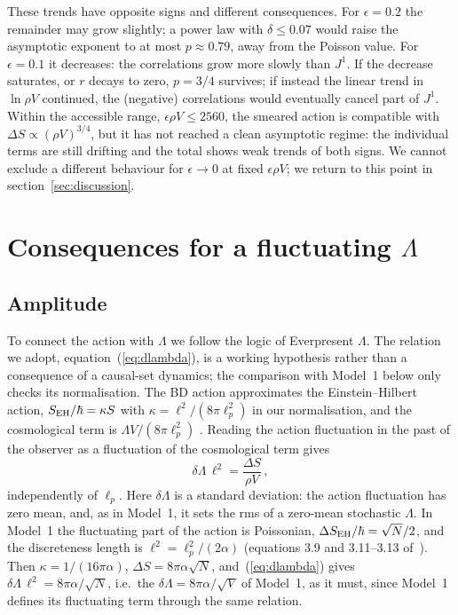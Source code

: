 \documentclass{iopjournal}
\newcommand{\eref}[1]{(\ref{#1})}
\newcommand{\rhoV}{\rho V}
\newcommand{\Jone}{J^{1}}
\begin{document}
These trends have opposite signs and different consequences. For
$\epsilon=0.2$ the remainder may grow slightly; a power law with
$\delta\le0.07$ would raise the asymptotic exponent to at most $p\approx0.79$,
away from the Poisson value. For $\epsilon=0.1$ it decreases: the
correlations grow more slowly than $\Jone$. If the decrease saturates, or $r$
decays to zero, $p=3/4$ survives; if instead the linear trend in $\ln\rhoV$
continued, the (negative) correlations would eventually cancel part of
$\Jone$. Within the accessible range, $\epsilon\rhoV\le2560$, the smeared
action is compatible with $\Delta S\propto(\rhoV)^{3/4}$, but it
has not reached a clean asymptotic regime: the individual terms are still
drifting and the total shows weak trends of both signs. We cannot exclude a
different behaviour for $\epsilon\to0$ at fixed $\epsilon\rhoV$; we return to
this point in section~\ref{sec:discussion}.

\section{Consequences for a fluctuating $\Lambda$}
\label{sec:lambda}

\subsection{Amplitude}

To connect the action with $\Lambda$ we follow the logic of Everpresent
$\Lambda$. The relation we adopt, equation~\eref{eq:dlambda}, is a working
hypothesis rather than a consequence of a causal-set dynamics; the comparison
with Model~1 below only checks its normalisation. The BD action approximates the Einstein--Hilbert action,
$S_{\rm EH}/\hbar=\kappa S$ with $\kappa=\ell^2/(8\pi\ell_p^2)$ in our
normalisation, and the cosmological term is $\Lambda V/(8\pi\ell_p^2)$
\cite{Das2023}. Reading the action fluctuation in the past of the observer as a
fluctuation of the cosmological term gives
\begin{equation}
\delta\Lambda\,\ell^2=\frac{\Delta S}{\rhoV}\,,
\label{eq:dlambda}
\end{equation}
independently of $\ell_p$. Here $\delta\Lambda$ is a standard deviation: the
action fluctuation has zero mean, and, as in Model~1, it sets the rms of a
zero-mean stochastic $\Lambda$. In Model~1 the fluctuating part of the
action is Poissonian, $\Delta S_{\rm EH}/\hbar=\sqrt N/2$, and the discreteness
length is $\ell^2=\ell_p^2/(2\alpha)$ (equations 3.9 and 3.11--3.13
of~\cite{Das2023}). Then $\kappa=1/(16\pi\alpha)$,
$\Delta S=8\pi\alpha\sqrt N$, and~\eref{eq:dlambda} gives
$\delta\Lambda\,\ell^2=8\pi\alpha/\sqrt N$, i.e.\ the
$\delta\Lambda=8\pi\alpha/\sqrt V$ of Model~1, as it must, since Model~1
defines its fluctuating term through the same relation.
\end{document}
